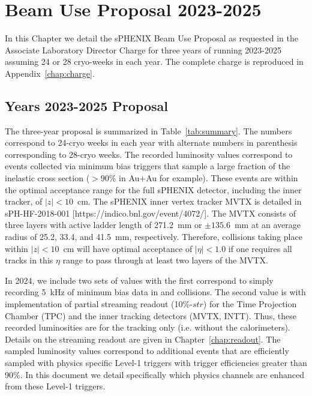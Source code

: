 \chapter{Beam Use Proposal 2023-2025}
\label{chap:beam_use_proposal}

In this Chapter we detail the sPHENIX Beam Use Proposal as requested in the Associate Laboratory Director Charge for three years of running 2023-2025 assuming 24 or 28 cryo-weeks in each year.  The complete charge is reproduced in Appendix~\ref{chap:charge}.   

\section{Years 2023-2025 Proposal}

The three-year proposal is summarized in Table~\ref{tab:summary}.   The numbers correspond to 24-cryo weeks in each year with alternate numbers in parenthesis corresponding to 28-cryo weeks.    The recorded luminosity values correspond to events collected via minimum bias triggers that sample a large fraction of the inelastic cross section ($> 90\%$ in Au+Au for example).    These events are within the optimal acceptance range for the full sPHENIX detector, including the inner tracker, of $|z|<10$~cm.    
The sPHENIX inner vertex tracker MVTX is detailed in sPH-HF-2018-001 [https://indico.bnl.gov/event/4072/].   The MVTX consists of three layers with active ladder length of 271.2~mm or $\pm135.6$~mm at an average radius of 25.2, 33.4, and 41.5~mm, respectively. Therefore, collisions taking place within $|z| < 10$~cm will have optimal acceptance of $|\eta| < 1.0$ if one requires all tracks in this $\eta$ range to pass through at least two layers of the MVTX.

In 2024, we include two sets of values with the first correspond to simply recording 5~kHz of minimum bias data in \pp and \pau collisions.   The second value is with implementation of partial streaming readout (10\%-$str$) for the Time Projection Chamber (TPC) and the inner tracking detectors (MVTX, INTT).    Thus, these recorded luminosities are for the tracking only (i.e. without the calorimeters).   Details on the streaming readout are given in Chapter~\ref{chap:readout}.
The sampled luminosity values correspond to additional events that are efficiently sampled with physics specific Level-1 triggers with trigger efficiencies greater than 90\%.    In this document we detail specifically which physics channels are enhanced from these Level-1 triggers.     

